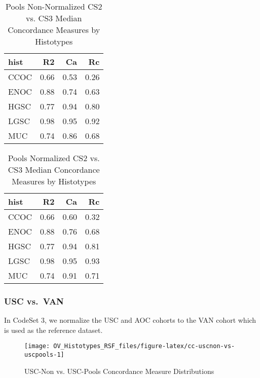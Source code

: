 \documentclass[
]{report}
\begin{document}
\begin{table}

\caption{\label{tab:pools-cs2non-vs-cs3}Pools Non-Normalized CS2 vs. CS3 Median Concordance Measures by Histotypes}
\centering
\begin{tabular}[t]{l|r|r|r}
\hline
hist & R2 & Ca & Rc\\
\hline
CCOC & 0.66 & 0.53 & 0.26\\
\hline
ENOC & 0.88 & 0.74 & 0.63\\
\hline
HGSC & 0.77 & 0.94 & 0.80\\
\hline
LGSC & 0.98 & 0.95 & 0.92\\
\hline
MUC & 0.74 & 0.86 & 0.68\\
\hline
\end{tabular}
\end{table}

\begin{table}

\caption{\label{tab:pools-cs2norm-vs-cs3}Pools Normalized CS2 vs. CS3 Median Concordance Measures by Histotypes}
\centering
\begin{tabular}[t]{l|r|r|r}
\hline
hist & R2 & Ca & Rc\\
\hline
CCOC & 0.66 & 0.60 & 0.32\\
\hline
ENOC & 0.88 & 0.76 & 0.68\\
\hline
HGSC & 0.77 & 0.94 & 0.81\\
\hline
LGSC & 0.98 & 0.95 & 0.93\\
\hline
MUC & 0.74 & 0.91 & 0.71\\
\hline
\end{tabular}
\end{table}

\hypertarget{usc-vs.-van}{%
\subsubsection{USC vs.~VAN}\label{usc-vs.-van}}

In CodeSet 3, we normalize the USC and AOC cohorts to the VAN cohort which is used as the reference dataset.

\begin{figure}[H]

{\centering \texttt{[image: OV\_Histotypes\_RSF\_files/figure-latex/cc-uscnon-vs-uscpools-1]} 

}

\caption{USC-Non vs. USC-Pools Concordance Measure Distributions}\label{fig:cc-uscnon-vs-uscpools}
\end{figure}
\end{document}
